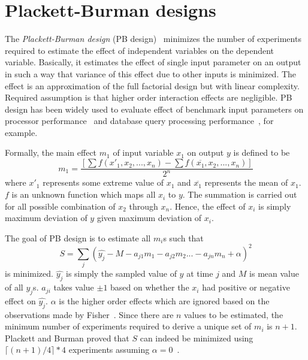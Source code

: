 \section{Plackett-Burman designs}
\label{BG_PB}
The \emph{Plackett-Burman design} (PB design)~\cite{plackett:1946} minimizes the number of experiments required to estimate the effect of independent variables on the dependent variable. 
Basically, it estimates the effect of single input parameter on an output in such a way that variance of this effect due to other inputs is minimized. 
The effect is an approximation of the full factorial design but with linear complexity. 
Required assumption is that higher order interaction effects are negligible. 
PB design has been widely used to evaluate effect of benchmark input parameters on processor performance~\cite{yi:2003} and database query processing performance~\cite{debnath:2008}, for example.

Formally, the main effect  $m_1$ of input variable $x_1$ on output $y$ is defined to be 
\begin{equation}
m_1 = \frac{[\sum f(x'_1, x_2, ..., x_n)-\sum f(\overline{x_1}, x_2, ..., x_n)]}{2^n}
\end{equation}
where $x'_1$ represents some extreme value of $x_1$ and $\overline{x_1}$ represents the mean of $x_1$. 
$f$ is an unknown function which maps all $x_i$ to $y$. 
The summation is carried out for all possible combination of $x_2$ through $x_n$. 
Hence, the effect of $x_i$ is simply maximum deviation of $y$ given maximum deviation of $x_i$. 

The goal of PB design is to estimate all $m_i$s such that
\begin{equation}
S=\sum\limits_j (\widehat{y_j}-M-a_{j1}m_1-a_{j2}m_{2}...-a_{jn}m_n+\alpha)^2
\end{equation}
is minimized. 
$\widehat{y_j}$ is simply the sampled value of $y$ at time $j$ and $M$ is mean value of all $y_j$s. 
$a_{ji}$ takes value $\pm 1$ based on whether the $x_i$ had positive or negative effect on $\widehat{y_j}$. 
$\alpha$ is the higher order effects which are ignored based on the observations made by Fisher~\cite{fisher:1936}. 
Since there are $n$ values to be estimated, the minimum number of experiments required to derive a unique set of $m_i$ is $n+1$. 
Plackett and Burman proved that $S$ can indeed be minimized using $\lceil(n+1)/4\rceil*4$ experiments assuming $\alpha = 0$~\cite{plackett:1946}.
